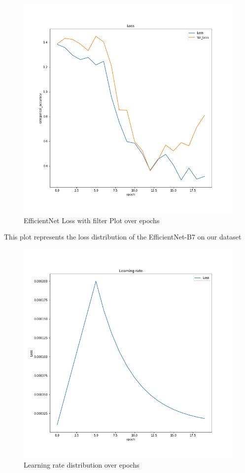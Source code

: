 \documentclass[a4paper]{article}
\begin{document}
 \begin{figure}[H]
    \includegraphics[width=\linewidth]{images/eff_loss.png}
            \caption{EfficientNet Loss with filter Plot over epochs}
    \label{fig:histoty_dense}
  \end{figure}    

This plot represents the loss distribution of the EfficientNet-B7 on our dataset
  
 \begin{figure}[H]
    \includegraphics[width=\linewidth]{images/history_lr.png}
            \caption{Learning rate distribution over epochs}
    \label{fig:histoty_dense}
  \end{figure}    
 
\end{document}
